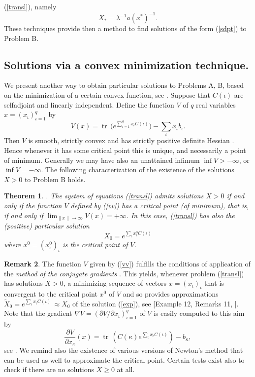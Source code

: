 \documentclass[12pt]{amsart}
\newtheorem{theorem}{Theorem}[section]
\theoremstyle{definition}
\newtheorem{remark}[theorem]{Remark}
\begin{document}
(\ref{transl}), namely 
\begin{equation}\label{sdpt}X_* =\lambda^{-1}a(x^* )^{-1}.\end{equation}
These techniques  provide then a  method to find solutions of the form (\ref{sdpt}) to Problem B. 

\subsection{Solutions via a convex minimization technique.}\label{ss:scmt}
We present another way to obtain   particular solutions  to Problems A, B, based on the minimization 
of a certain convex function, see  \cite{ca}. 
Suppose that $C(\iota )$ are selfadjoint and linearly independent.
Define   the function $V$ of $q$ real variables $x=(x_\iota )_{\iota =1}^q$ by
\begin{equation}\label{vv}
V(x)={\operatorname{tr}}\, \big( e^{\sum_{\iota =1}^q x_\iota C(\iota )} \big)
-\sum_\iota x_\iota b_\iota .\end{equation}
 Then $V$ is smooth, strictly convex and has  strictly positive definite Hessian \cite{ca}. Hence whenever it has some critical point this is unique,
 and necessarily a point of minimum. Generally we may have also an unattained infimum $\inf V> -\infty$, 
or $\inf V=-\infty $.
 The following characterization of the existence of the solutions $X>0$ to 
 Problem B holds.

\begin{theorem}\label{minimizare}{\rm \cite{ca}}.
The system of equations (\ref{transl}) admits solutions $X>0$ if and only if the function $V$ defined by (\ref{vv}) has a critical point (of minimum), that is, if and only if $\lim_{\| x\| \to \infty }V(x)=+\infty$.
 In this case, (\ref{transl}) has also the (positive) particular solution
\begin{equation}\label{exp}
X_0 =e^{\sum_\iota x^{0}_\iota C(\iota )}
\end{equation}
where $x^0 =(x_{\iota}^0 )_\iota$ is the  critical point of $V$.
\end{theorem}

\begin{remark}\label{grad}
{\rm The function $V$ given by (\ref{vv})  fulfills the conditions of application of the
  {\it method of the conjugate gradients} \cite{HrLm}. This yields,
 whenever problem (\ref{transl}) has solutions $X>0$, a minimizing sequence
of vectors $x=(x_\iota )_\iota$ that is convergent to the critical point $x^0$ of $V$
 and so provides  approximations $\widetilde{X}_0 =e^{\sum_{\iota}x_\iota C(\iota )}\, \approx X_0$ of the solution  
(\ref{exp}), see  [Example 12, Remarks 11, \cite{ca}]. 
Note that the gradient $\nabla V =(\partial V/\partial x_\iota )_{\iota =1}^q$ of $V$ is easily computed to this aim
by $$\frac{\partial V}{\partial x_\kappa }(x)=  {\operatorname{tr}}\, (C(\kappa ) e^{\sum_\iota x_\iota C(\iota )} ) -b_\kappa ,$$ see \cite{ca}. 
We remind also the existence of various versions of  Newton's method that can be used as well to approximate the critical point. Certain tests exist \cite{ca} also to check if there are no solutions $X\geq 0$ at all.} 
\end{remark}
\end{document}
